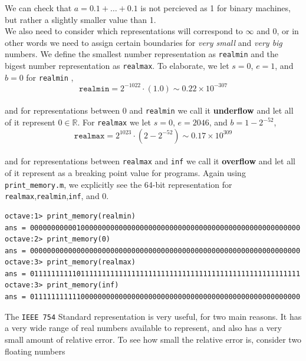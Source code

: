 \documentclass[paper=a4, fontsize=11pt]{scrartcl}
\begin{document}
We can check that $a=0.1 + \dots + 0.1$ is not percieved as 1 for binary machines, but rather a slightly smaller value than 1.  \\
 
We also need to consider which representations will correspond to $\infty$ and $0$, or in other words we need to assign certain boundaries for \textit{very small} and \textit{very big} numbers. We define the smallest number representation as \texttt{realmin} and the bigest number representation as \texttt{realmax}. To elaborate, we let $s=0$, $e=1$, and $b=0$ for \texttt{realmin} ,\\

\begin{equation}\nonumber
	\texttt{realmin} = 2^{-1022} \cdot (1.0) \sim 0.22 \times 10^{-307}
\end{equation}\\

and for representations between 0 and \texttt{realmin} we call it \textbf{underflow} and let all of it represent $0 \in \mathbb{R}$. For \texttt{realmax} we let $s=0$, $e=2046$, and $b=1-2^{-52}$,\\

\begin{equation}\nonumber
	\texttt{realmax} = 2^{1023} \cdot (2 - 2^{-52}) \sim 0.17 \times 10^{309}
\end{equation}\\

and for representations between \texttt{realmax} and \texttt{inf} we call it \textbf{overflow} and let all of it represent as a breaking point value for programs. Again using \texttt{print\_memory.m}, we explicitly see the 64-bit representation for \texttt{realmax},\texttt{realmin},\texttt{inf}, and 0.

\vspace{0.15in}
\begin{verbatim}
octave:1> print_memory(realmin)
ans = 0000000000010000000000000000000000000000000000000000000000000000
octave:2> print_memory(0)
ans = 0000000000000000000000000000000000000000000000000000000000000000
octave:3> print_memory(realmax)
ans = 0111111111101111111111111111111111111111111111111111111111111111
octave:3> print_memory(inf)
ans = 0111111111110000000000000000000000000000000000000000000000000000
\end{verbatim}
\vspace{0.15in}

The \texttt{IEEE 754} Standard representation is very useful, for two main reasons. It has a very wide range of real numbers available to represent, and also has a very small amount of relative error. To see how small the relative error is, consider two floating numbers\\
\end{document}
